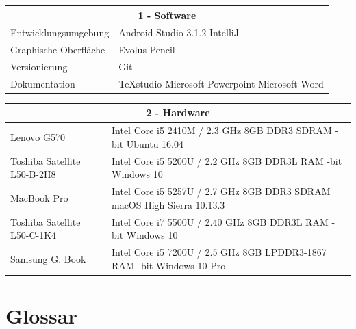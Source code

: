 \documentclass[a4paper]{scrreprt}
\begin{document}
    \begin{table}[h!]
    	\centering
    	\label{my-label}
    	\begin{tabular}{p{5.5cm}p{8.5cm}}
    		
    		\multicolumn{2}{c}{\textbf{1 - Software}} \\ \hline
    		Entwicklungsumgebung & Android Studio 3.1.2 \newline IntelliJ\\
    		Graphische Oberfläche& Evolus Pencil                               \\
    		Versionierung & Git \\
    		Dokumentation & TeXstudio \newline Microsoft Powerpoint \newline Microsoft Word \\
    		\hline
    	\end{tabular}
    \end{table}
    
    \vspace{5mm}
    
    \begin{table}[h!]
    	\centering
    	\label{my-label}
    	\begin{tabular}{p{5.5cm}p{8.5cm}}
    		
    		\multicolumn{2}{c}{\textbf{2 - Hardware}} \\ \hline
    		Lenovo G570 & Intel Core i5 2410M / 2.3 GHz \newline 8GB DDR3 SDRAM \newline 64-bit Ubuntu 16.04\\
    		Toshiba Satellite \newline L50-B-2H8 & Intel Core i5 5200U / 2.2 GHz \newline 8GB DDR3L RAM \newline 64-bit Windows 10                              \\
    		MacBook Pro & Intel Core i5 5257U / 2.7 GHz \newline 8GB DDR3 SDRAM \newline macOS High Sierra 10.13.3\\ 
    		Toshiba Satellite \newline L50-C-1K4 & Intel Core i7 5500U / 2.40 GHz \newline 8GB DDR3L RAM \newline 64-bit Windows 10\\ 
    		Samsung G. Book & Intel Core i5 7200U / 2.5 GHz \newline 8GB LPDDR3-1867 RAM \newline 64-bit Windows 10 Pro \\
    		\hline
    	\end{tabular}
    \end{table}

	\chapter{Glossar}
	
    \glsaddall
    \printglossaries

    \listoffigures
\end{document}
